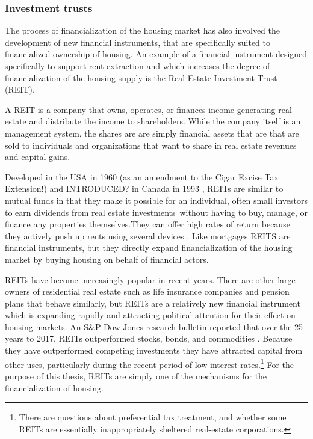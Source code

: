 \subsubsection{Investment trusts}
The process of financialization of the housing market has also involved the development of new financial instruments, that are specifically suited to financialized ownership of housing. An example of a financial instrument designed specifically to support rent extraction and which increases the degree of financialization of the housing supply is the Real Estate Investment Trust (\gls{REIT}). 

A REIT is a company that owns, operates, or finances income-generating real estate and distribute the income to shareholders. While the company itself is an management system, the shares are are simply financial assets that are that are sold to individuals and organizations that want to share in real estate revenues and capital gains. 

Developed in the USA  in 1960 (as an amendment to the Cigar Excise Tax Extension!) and INTRODUCED? in Canada in 1993 \cite{GET_REITsDevelopedDates}, REITs are similar to mutual funds in that they make it possible for an individual, often small investors to earn dividends from real estate investments without having to buy, manage, or finance any properties themselves.They can offer high rates of return because they actively push up rents using several devices \cite{GET-Martine-August, farhaReportFinancializationHousing2017}. Like mortgages REITS are financial instruments, but they directly expand financialization of the housing market by buying housing on behalf of financial actors. 

REITs have become increasingly popular in recent years. There are other large owners of residential real estate such as life insurance companies and pension plans that behave similarly, but REITs are a relatively new financial instrument which is expanding rapidly and attracting political attention for their effect on housing markets.  %
An S\&P-Dow Jones research bulletin reported that over the 25 years to 2017, REITs outperformed stocks, bonds, and commodities \cite{GET-Dow-Jones-research-bulletin}. Because they have outperformed competing investments they have attracted  capital from other uses, particularly during the recent period of low interest rates.\footnote{There are questions about preferential tax treatment, and whether some REITs are essentially inappropriately sheltered real-estate corporations.} For the purpose of this thesis, REITs are simply one of the mechanisms for the financialization of housing.

